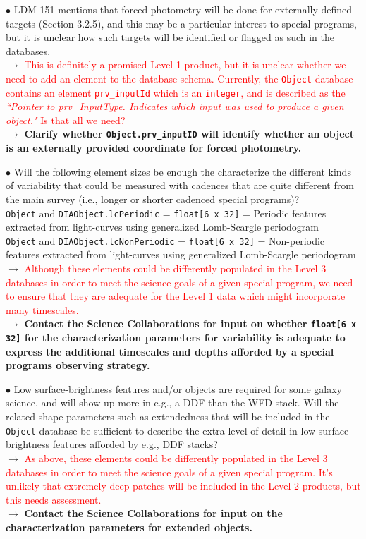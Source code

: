 \documentclass[DM,lsstdraft,toc]{lsstdoc}
\begin{document}
$\bullet$ LDM-151 mentions that forced photometry will be done for externally defined targets (Section 3.2.5), and this may be a particular interest to special programs, but it is unclear how such targets will be identified or flagged as such in the databases. \\
$\rightarrow$ \textcolor{red}{This is definitely a promised Level 1 product, but it is unclear whether we need to add an element to the database schema. Currently, the {\tt Object} database contains an element {\tt prv\_inputId} which is an {\tt integer}, and is described as the {\it ``Pointer to prv\_InputType. Indicates which input was used to produce a given object."} Is that all we need?} \\
$\rightarrow$  \textbf{Clarify whether {\tt Object.prv\_inputID} will identify whether an object is an externally provided coordinate for forced photometry.}

$\bullet$ Will the following element sizes be enough the characterize the different kinds of variability that could be measured with cadences that are quite different from the main survey (i.e., longer or shorter cadenced special programs)? \\
{\tt Object} and {\tt DIAObject.lcPeriodic} = {\tt float[6 x 32]} = Periodic features extracted from light-curves using generalized Lomb-Scargle periodogram \\
{\tt Object} and {\tt DIAObject.lcNonPeriodic} = {\tt float[6 x 32]} = Non-periodic features extracted from light-curves using generalized Lomb-Scargle periodogram \\
$\rightarrow$ \textcolor{red}{Although these elements could be differently populated in the Level 3 databases in order to meet the science goals of a given special program, we need to ensure that they are adequate for the Level 1 data which might incorporate many timescales.}\\
$\rightarrow$  \textbf{Contact the Science Collaborations for input on whether {\tt float[6 x 32]} for the characterization parameters for variability is adequate to express the additional timescales and depths afforded by a special programs observing strategy.}

$\bullet$ Low surface-brightness features and/or objects are required for some galaxy science, and will show up more in e.g., a DDF than the WFD stack. Will the related shape parameters such as extendedness that will be included in the {\tt Object} database be sufficient to describe the extra level of detail in low-surface brightness features afforded by e.g., DDF stacks? \\
$\rightarrow$ \textcolor{red}{As above, these elements could be differently populated in the Level 3 databases in order to meet the science goals of a given special program. It's unlikely that extremely deep patches will be included in the Level 2 products, but this needs assessment.}\\
$\rightarrow$  \textbf{Contact the Science Collaborations for input on the characterization parameters for extended objects.}
\end{document}
